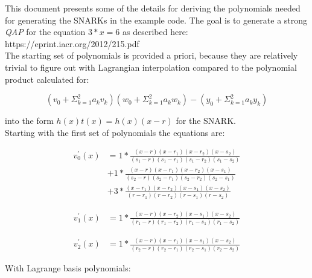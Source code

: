\documentclass{article}
\begin{document}

\noindent This document presents some of the details for deriving the polynomials needed for generating the SNARKs in
the example code. The goal is to generate a strong \textit{QAP} for the equation $ 3 * x = 6 $ as described here:
https://eprint.iacr.org/2012/215.pdf \\ 

\noindent The starting set of polynomials is provided a priori, because they are relatively trivial to figure out with
Lagrangian interpolation compared to the polynomial product calculated for:

\[
    (v_{0} + \Sigma_{k = 1}^{2} a_{k} v_{k}) (w_{0} + \Sigma_{k = 1}^{2} a_{k} w_{k}) - (y_{0} + \Sigma_{k = 1}^{2} a_{k} y_{k})
\]

\noindent into the form $ h(x) t(x) = h(x) (x - r) $ for the SNARK. \\

\noindent Starting with the first set of polynomials the equations are:

\begin{align*}
    v^{'}_{0}(x) &= 1 * \frac{(x  -  r) (x  - r_{1}) (x - r_{2}) (x  - s_{2})}{(s_{1} -  r) (s_{1} - r_{1}) (s_{1} - r_{2}) (s_{1} - s_{2})} \\
    &+ 1 * \frac{(x  -  r) (x  - r_{1}) (x  - r_{2}) (x  - s_{1})}{(s_{2} -  r) (s_{2} - r_{1}) (s_{2} - r_{2}) (s_{2} - s_{1})} \\
    &+ 3 * \frac{ (x  - r_{1}) (x  - r_{2}) (x  - s_{1}) (x  - s_{2})}{(r  - r_{1}) (r  - r_{2}) (r  - s_{1}) (r  - s_{2})}
\end{align*}

\begin{align*}
    v^{'}_{1}(x) &= 1 * \frac{(x  -  r) (x  - r_{2}) (x  - s_{1}) (x  - s_{2})}{(r_{1} -  r) (r_{1} - r_{2}) (r_{1} - s_{1}) (r_{1} - s_{2})}
\end{align*}

\begin{align*}
    v^{'}_{2}(x) &= 1 * \frac{(x  -  r) (x  - r_{1}) (x  - s_{1}) (x  - s_{2})}{(r_{2} -  r) (r_{2} - r_{1}) (r_{2} - s_{1}) (r_{2} - s_{2})}
\end{align*}

\noindent With Lagrange basis polynomials:
\end{document}
